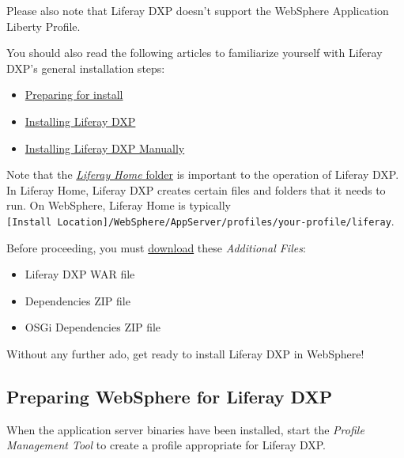 Please also note that Liferay DXP doesn't support the WebSphere
Application Liberty Profile.

You should also read the following articles to familiarize yourself with
Liferay DXP's general installation steps:

\begin{itemize}
\tightlist
\item
  \href{/docs/7-0/deploy/-/knowledge_base/d/preparing-for-install}{Preparing
  for install}
\item
  \href{/docs/7-0/deploy/-/knowledge_base/d/installing-product}{Installing
  Liferay DXP}
\item
  \href{/docs/7-0/deploy/-/knowledge_base/d/installing-liferay-manually}{Installing
  Liferay DXP Manually}
\end{itemize}

Note that the
\href{/docs/7-0/deploy/-/knowledge_base/d/installing-product\#liferay-home}{\emph{Liferay
Home} folder} is important to the operation of Liferay DXP. In Liferay
Home, Liferay DXP creates certain files and folders that it needs to run.
On WebSphere, Liferay Home is typically
\texttt{{[}Install\ Location{]}/WebSphere/AppServer/profiles/your-profile/liferay}.

Before proceeding, you must \href{https://help.liferay.com/hc}{download}
these \emph{Additional Files}:

\begin{itemize}
\tightlist
\item
  Liferay DXP WAR file
\item
  Dependencies ZIP file
\item
  OSGi Dependencies ZIP file
\end{itemize}

Without any further ado, get ready to install Liferay DXP in WebSphere!

\subsection{Preparing WebSphere for Liferay
DXP}\label{preparing-websphere-for-liferay-dxp}

When the application server binaries have been installed, start the
\emph{Profile Management Tool} to create a profile appropriate for
Liferay DXP.

